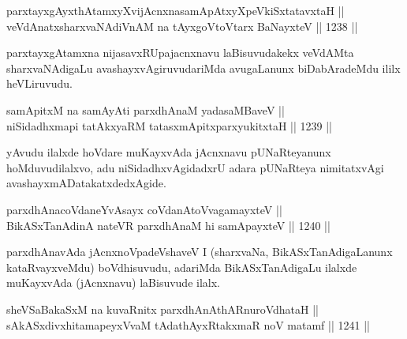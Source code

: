 \begin{shl}
parxtayxgAyxthAtamxyXvijAcnxnasamApAtxyX\s peVkiSxtatavxtaH ||  \\
veVdAnatxsharxvaNAdiVnAM na tAyxgoV\s toV\s tarx BaNayxteV \hfill || 1238 ||  
\end{shl}

\begin{artha}
parxtayxgAtamxna nijasavxRUpajacnxnavu laBisuvudakekx veVdAMta sharxvaNAdigaLu avashayxvAgiruvudariMda avugaLanunx biDabAradeMdu ililx heVLiruvudu.
\end{artha}


\begin{shl}
samApitxM na samAyAti parxdhAnaM yadasaMBaveV || \\
niSidadhxmapi tatAkxyaRM tatasxmApitxparxyukitxtaH \hfill || 1239 ||  
\end{shl}

\begin{artha}
yAvudu ilalxde hoVdare muKayxvAda jAcnxnavu pUNaRteyanunx hoMduvudilalxvo, adu niSidadhxvAgidadxrU adara pUNaRteya nimitatxvAgi avashayxmADatakatxdedxAgide.
\end{artha}


\begin{shl}
parxdhAnacoVdaneYvAsayx coVdanAtoV\s vagamayxteV || \\
BikASxTanAdinA nateVR parxdhAnaM hi samApayxteV \hfill || 1240 ||  
\end{shl}

\begin{artha}
parxdhAnavAda jAcnxnoVpadeVshaveV I (sharxvaNa, BikASxTanAdigaLanunx kataRvayxveMdu) boVdhisuvudu, adariMda BikASxTanAdigaLu  ilalxde muKayxvAda (jAcnxnavu) laBisuvude ilalx.
\end{artha}

\begin{shl}
\footnotemark[1]sheVSaBakaSxM na kuvaRnitx parxdhAnAthARnuroVdhataH || \\
sAkASxdivxhitamapeyxVvaM tAdathAyxRtakxmaR noV matamf \hfill || 1241 ||  
\end{shl}

